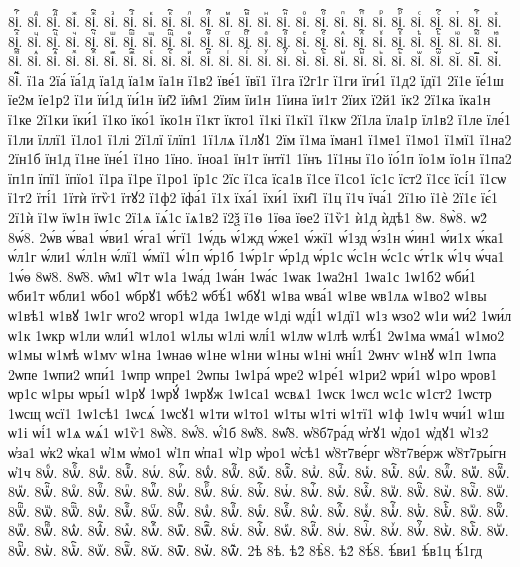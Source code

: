 {8іⷢ҇.
8іⷣ.
8іⷣ҇.
8іⷤ.
8іⷤ҇.
8іⷥ.
8іⷥ҇.
8іⷦ.
8іⷦ҇.
8іⷧ.
8іⷧ҇.
8іⷨ.
8іⷨ҇.
8іⷩ.
8іⷩ҇.
8іⷪ.
8іⷪ҇.
8іⷫ.
8іⷫ҇.
8іⷬ.
8іⷬ҇.
8іⷭ.
8іⷭ҇.
8іⷮ.
8іⷮ҇.
8іⷯ.
8іⷯ҇.
8іⷰ.
8іⷰ҇.
8іⷱ.
8іⷱ҇.
8іⷲ.
8іⷲ҇.
8іⷳ.
8іⷳ҇.
8іⷴ.
8іⷴ҇.
8іⷵ.
8іⷵ҇.
8іⷶ.
8іⷶ҇.
8іⷷ.
8іⷷ҇.
8іⷸ.
8іⷸ҇.
8іⷹ.
8іⷹ҇.
8іⷺ.
8іⷺ҇.
8іⷻ.
8іⷻ҇.
8іⷼ.
8іⷼ҇.
8іⷽ.
8іⷽ҇.
8іⷾ.
8іⷾ҇.
8іⷿ.
8іⷿ҇.
8іꙴ.
8іꙴ҇.
8іꙵ.
8іꙵ҇.
8іꙶ.
8іꙶ҇.
8іꙷ.
8іꙷ҇.
8іꙸ.
8іꙸ҇.
8іꙹ.
8іꙹ҇.
8іꙺ.
8іꙺ҇.
8іꙻ.
8іꙻ҇.
8і꙼.
8і꙼҇.
8і꙽.
8і꙽҇.
ї1а
2їа́
їа́1д
їа1д
їа1м
їа1н
ї1в2
їве́1
ївї1
ї1га
ї2г1г
ї1ги
їги́1
ї1д2
їдї1
2ї1е
їе́1ш
їе2м
їе1р2
ї1и
їи́1д
їи́1н
їи̑2
їи̑м1
2їим
їи1н
1їина
їи1т
2їих
ї2й1
їк2
2ї1ка
їка1н
ї1ке
2ї1ки
їки́1
ї1ко
їко́1
їко1н
ї1кт
їкто1
ї1кі
ї1кї1
ї1кѡ
2ї1ла
їла1р
їл1в2
ї1ле
їле́1
ї1ли
їллї1
ї1ло1
ї1лі
2ї1лї
їлїп1
1ї1лѧ
ї1лꙋ1
2їм
ї1ма
їман1
ї1ме1
ї1мо1
ї1мї1
ї1на2
2їн1б
їн1д
ї1не
їне́1
ї1но
1їно.
їноа1
їн1т
їнтї1
1їнъ
1ї1ны
ї1о
їо́1п
їо1м
їо1н
ї1па2
їп1п
їпї1
їпїо1
ї1ра
ї1ре
ї1ро1
їр1с
2їс
ї1са
їса1в
ї1се
ї1со1
їс1с
їст2
ї1сє
їсі́1
ї1сѡ
ї1т2
їті́1
1їтѝ
їтѷ1
їтꙋ2
ї1ф2
їфа́1
ї1х
їха́1
їхи́1
їхи̑1
ї1ц
ї1ч
їча́1
2ї1ю
ї1ѐ
2ї1є
їє́1
2ї1ѝ
ї1ѡ
їѡ1н
їѡ1с
2ї1ѧ
їѧ́1с
їѧ1в2
ї2ѯ
ї1ѳ
1їѳа
їѳе2
ї1ѷ1
ѝ1д
ѝдѣ1
8ѡ.
8ѡ̀8.
ѡ2́
8ѡ́8.
2ѡ́в
ѡ́ва1
ѡ́ви1
ѡ́га1
ѡ́гї1
1ѡ́дь
ѡ́1жд
ѡ́же1
ѡ́жї1
ѡ́1зд
ѡ́з1н
ѡ́ин1
ѡ́и1х
ѡ́ка1
ѡ́л1г
ѡ́ли1
ѡ́л1н
ѡ́лї1
ѡ́мї1
ѡ́1п
ѡ́р1б
1ѡ́р1г
ѡ́р1д
ѡ́р1с
ѡ́с1н
ѡ́с1с
ѡ́т1к
ѡ́1ч
ѡ́ча1
1ѡ́ѳ
8ѡ̈8.
8ѡ̑8.
ѡ̑м1
ѡ̑1т
ѡ1а
1ѡа́д
1ѡа́н
1ѡа́с
1ѡак
1ѡа2н1
1ѡа1с
1ѡ1б2
ѡби́1
ѡби1т
ѡбли1
ѡбо1
ѡбрꙋ1
ѡбѣ2
ѡбѣ́1
ѡбꙋ1
ѡ1ва
ѡва́1
ѡ1ве
ѡв1лѧ
ѡ1во2
ѡ1вы
ѡ1вѣ1
ѡ1вꙋ
1ѡ1г
ѡго2
ѡгор1
ѡ1да
1ѡ1де
ѡ1ді
ѡді́1
ѡ1дї1
ѡ1з
ѡзо2
ѡ1и
ѡи́2
1ѡи́л
ѡ1к
1ѡкр
ѡ1ли
ѡли́1
ѡ1ло1
ѡ1лы
ѡ1лі
ѡлі́1
ѡ1лѡ
ѡ1лѣ
ѡлѣ́1
2ѡ1ма
ѡма́1
ѡ1мо2
ѡ1мы
ѡ1мѣ
ѡ1мѵ
ѡ1на
1ѡнаѳ
ѡ1не
ѡ1ни
ѡ1ны
ѡ1ні
ѡні́1
2ѡнѵ
ѡ1нꙋ
ѡ1п
1ѡпа
2ѡпе
1ѡпи2
ѡпи́1
1ѡпр
ѡпре1
2ѡпы
1ѡ1ра́
ѡре2
ѡ1ре́1
ѡ1ри2
ѡри́1
ѡ1ро
ѡров1
ѡр1с
ѡ1ры
ѡры́1
ѡ1рꙋ
1ѡрꙋ́
1ѡрꙋж
1ѡ1са1
ѡсвѧ1
1ѡск
1ѡсл
ѡс1с
ѡ1ст2
1ѡстр
1ѡсщ
ѡсї1
1ѡ1сѣ1
1ѡсѧ́
1ѡсꙋ1
ѡ1ти
ѡ1то1
ѡ1ты
ѡ1ті
ѡ1тї1
ѡ1ф
1ѡ1ч
ѡчи́1
ѡ1ш
ѡ1і
ѡі́1
ѡ1ѧ
ѡѧ́1
ѡ1ѷ1
8ѡ҆̀8.
8ѡ҆́8.
ѡ҆́1б
8ѡ҆̈8.
8ѡ҆̑8.
ѡ҆8б7ра́д
ѡ҆гꙋ1
ѡ҆до1
ѡ҆дꙋ1
ѡ҆1з2
ѡ҆за1
ѡ҆к2
ѡ҆ка1
ѡ҆1м
ѡ҆мо1
ѡ҆1п
ѡ҆па1
ѡ҆1р
ѡ҆ро1
ѡ҆сѣ1
ѡ҆8т7ве́рг
ѡ҆8т7ве́рж
ѡ҆8т7ры́гн
ѡ҆1ч
8ѡⷠ.
8ѡⷠ҇.
8ѡⷡ.
8ѡⷡ҇.
8ѡⷢ.
8ѡⷢ҇.
8ѡⷣ.
8ѡⷣ҇.
8ѡⷤ.
8ѡⷤ҇.
8ѡⷥ.
8ѡⷥ҇.
8ѡⷦ.
8ѡⷦ҇.
8ѡⷧ.
8ѡⷧ҇.
8ѡⷨ.
8ѡⷨ҇.
8ѡⷩ.
8ѡⷩ҇.
8ѡⷪ.
8ѡⷪ҇.
8ѡⷫ.
8ѡⷫ҇.
8ѡⷬ.
8ѡⷬ҇.
8ѡⷭ.
8ѡⷭ҇.
8ѡⷮ.
8ѡⷮ҇.
8ѡⷯ.
8ѡⷯ҇.
8ѡⷰ.
8ѡⷰ҇.
8ѡⷱ.
8ѡⷱ҇.
8ѡⷲ.
8ѡⷲ҇.
8ѡⷳ.
8ѡⷳ҇.
8ѡⷴ.
8ѡⷴ҇.
8ѡⷵ.
8ѡⷵ҇.
8ѡⷶ.
8ѡⷶ҇.
8ѡⷷ.
8ѡⷷ҇.
8ѡⷸ.
8ѡⷸ҇.
8ѡⷹ.
8ѡⷹ҇.
8ѡⷺ.
8ѡⷺ҇.
8ѡⷻ.
8ѡⷻ҇.
8ѡⷼ.
8ѡⷼ҇.
8ѡⷽ.
8ѡⷽ҇.
8ѡⷾ.
8ѡⷾ҇.
8ѡⷿ.
8ѡⷿ҇.
8ѡꙴ.
8ѡꙴ҇.
8ѡꙵ.
8ѡꙵ҇.
8ѡꙶ.
8ѡꙶ҇.
8ѡꙷ.
8ѡꙷ҇.
8ѡꙸ.
8ѡꙸ҇.
8ѡꙹ.
8ѡꙹ҇.
8ѡꙺ.
8ѡꙺ҇.
8ѡꙻ.
8ѡꙻ҇.
8ѡ꙼.
8ѡ꙼҇.
8ѡ꙽.
8ѡ꙽҇.
2ѣ
8ѣ.
ѣ2̀
8ѣ̀8.
ѣ2́
8ѣ́8.
ѣ́ви1
ѣ́в1ц
ѣ́1гд
}
